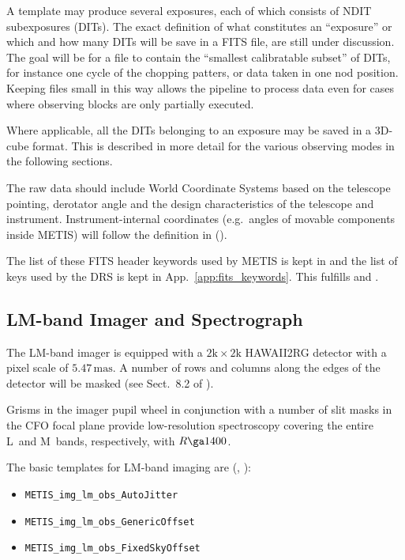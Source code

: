 A template may produce several exposures, each of which consists of
NDIT subexposures (DITs). The exact definition of what constitutes an
``exposure'' or which and how many DITs will be save in a FITS file,
are still under discussion. The goal will be for a file to contain the
``smallest calibratable subset'' of DITs, for instance one cycle of
the chopping patters, or data taken in one nod position. Keeping files
small in this way allows the pipeline to process data even for cases
where observing blocks are only partially executed.

Where applicable, all the DITs belonging to an exposure may be saved
in a 3D-cube format. This is described in more detail for the various
observing modes in the following sections.

The raw data should include World Coordinate Systems based on the
telescope pointing, derotator angle and the design characteristics of
the telescope and instrument. Instrument-internal coordinates
(e.g.~angles of movable components inside METIS) will follow the
definition in \cite{METIS-coordinates} ().

The list of these FITS header keywords used by METIS is kept in
\cite{METIS-DID} and the list of keys used by the \acs{DRS} is kept in App.~\ref{app:fits_keywords}. This fulfills  and .




\subsection{LM-band Imager and Spectrograph}
\label{ssec:instrument_data_LM-IMG}

The LM-band imager is equipped with a $2\mathrm{k}\times2\mathrm{k}$
HAWAII2RG detector with a pixel scale of $5.47\,\mathrm{mas}$. A
number of rows and columns along the edges of the detector will be
masked (see Sect.~8.2 of \cite{DRLS}).

Grisms in the imager pupil wheel in conjunction with a number of slit
masks in the CFO focal plane provide low-resolution spectroscopy
covering the entire L~and M~bands, respectively, with $R\ga 1400$.

The basic templates for LM-band imaging are
(\cite{METIS-operational_concept}, \cite{METIS-template_manual}):
\begin{itemize}
\item \lstinline{METIS_img_lm_obs_AutoJitter}
\item \lstinline{METIS_img_lm_obs_GenericOffset}
\item \lstinline{METIS_img_lm_obs_FixedSkyOffset}
\end{itemize}

